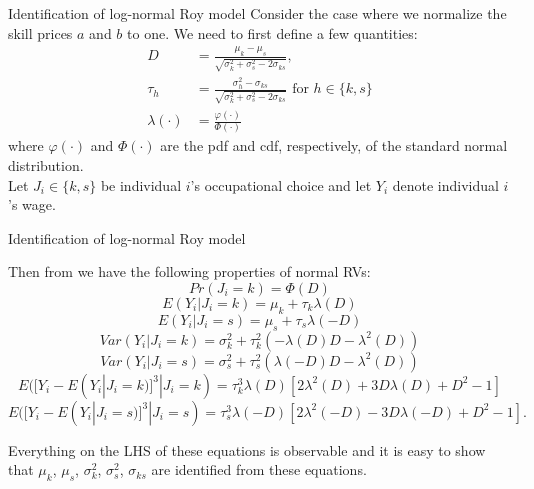 \documentclass{beamer}
\begin{document}
	\begin{frame}{Identification of log-normal Roy model}
		Consider the case where we normalize the skill prices $a$ and $b$ to one. We need to first define a few quantities:	
			\begin{align*}
			D &= \frac{\mu_k - \mu_s}{\sqrt{\sigma_k^2 + \sigma_s^2 - 2\sigma_{ks}}},\\
			\tau_h &= \frac{\sigma_h^2 - \sigma_{ks}}{\sqrt{\sigma_k^2 + \sigma_s^2 - 2\sigma_{ks}}} \text{ for } h \in \{k,s\}\\
			\lambda(\cdot) &= \frac{\varphi(\cdot)}{\Phi(\cdot)}
		\end{align*}
		where $\varphi(\cdot)$ and $\Phi(\cdot)$ are the pdf and cdf, respectively, of the standard normal distribution.\\
		\vspace{0.2cm}
		Let $J_i \in \{k,s\}$ be individual $i$'s occupational choice and let $Y_i$ denote individual $i$'s wage.
	\end{frame}
	
	\begin{frame}{Identification of log-normal Roy model}
		
		Then from \citet{heckman1990empirical} we have the following properties of normal RVs:
		\begin{equation*}
			Pr(J_i = k) = \Phi(D)
		\end{equation*}
		\begin{equation*}
			E(Y_i | J_i = k) = \mu_k + \tau_k \lambda(D)
		\end{equation*}
		\begin{equation*}
			E(Y_i | J_i = s) = \mu_s + \tau_s \lambda(-D)
		\end{equation*}
		\begin{equation*}
			Var(Y_i | J_i = k) = \sigma_k^2 + \tau_k^2(-\lambda(D)D - \lambda^2(D))
		\end{equation*}
		\begin{equation*}
			Var(Y_i | J_i = s) = \sigma_s^2 + \tau_s^2(\lambda(-D)D - \lambda^2(D))
		\end{equation*}
		\begin{equation*}
			E([Y_i - E(Y_i|J_i = k)]^3|J_i = k) = \tau_k^3 \lambda(D)[2\lambda^2(D) + 3 D \lambda(D) + D^2 -1]
		\end{equation*}
		\begin{equation*}
			E([Y_i - E(Y_i|J_i = s)]^3|J_i = s) = \tau_s^3 \lambda(-D)[2\lambda^2(-D) - 3 D \lambda(-D) + D^2 -1].
		\end{equation*}
		\vspace{0.1cm}
		
		Everything on the LHS of these equations is observable and it is easy to show that $\mu_k$, $\mu_s$, $\sigma_k^2$, $\sigma_s^2$, $\sigma_{ks}$ are identified from these equations. 
	\end{frame}
	
\end{document}
